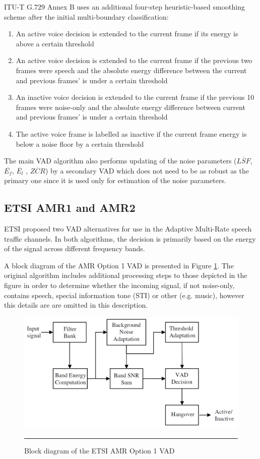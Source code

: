 ITU-T G.729 Annex B uses an additional four-step heuristic-based smoothing scheme after the initial multi-boundary classification:
\begin{enumerate}
\item An active voice decision is extended to the current frame if its energy is above a certain threshold
\item An active voice decision is extended to the current frame if the previous two frames were speech and the absolute energy difference between the current and previous frames' is under a certain threshold
\item An inactive voice decision is extended to the current frame if the previous 10 frames were noise-only and the absolute energy difference between current and previous frames' is under a certain threshold
\item The active voice frame is labelled as inactive if the current frame energy is below a noise floor by a certain threshold
\end{enumerate}

The main VAD algorithm also performs updating of the noise parameters ($\overline{LSF}$, $\overline{E_f}$, $\overline{E_l}$ , $\overline{ZCR}$) by a secondary VAD which does not need to be as robust as the primary one since it is used only for estimation of the noise parameters.

\subsection{ETSI AMR1 and AMR2}

ETSI proposed two VAD alternatives for use in the Adaptive Multi-Rate speech traffic channels. In both algorithms, the decision is primarily based on the energy of the signal across different frequency bands.

A block diagram of the AMR Option 1 VAD is presented in Figure \ref{fig:AMR1}. The original algorithm includes additional processing steps to those depicted in the figure in order to determine whether the incoming signal, if not noise-only, contains speech, special information tone (STI) or other (e.g. music), however this details are are omitted in this description.

\begin{figure}[htbp]
	\centering
		\includegraphics[width=0.9\columnwidth]{Figures/Chapter2/AMR1.png}
		\rule{37em}{0.5pt}
	\caption[Block diagram of the ETSI AMR Option 1 VAD]{Block diagram of the ETSI AMR Option 1 VAD \cite{Kondoz}}
	\label{fig:AMR1}
\end{figure}

